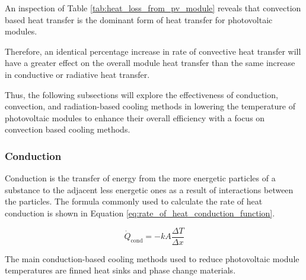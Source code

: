 An inspection of Table \ref{tab:heat_loss_from_pv_module} reveals that convection based heat transfer is the dominant form of heat transfer for photovoltaic modules.\par
Therefore, an identical percentage increase in rate of convective heat transfer will have a greater effect on the overall module heat transfer than the same increase in conductive or radiative heat transfer.\par
Thus, the following subsections will explore the effectiveness of conduction, convection, and radiation-based cooling methods in lowering the temperature of photovoltaic modules to enhance their overall efficiency with a focus on convection based cooling methods.\vspace{0.5em}


\subsubsection{Conduction}
Conduction is the transfer of energy from the more energetic particles of a substance to the adjacent less energetic ones as a result of interactions between the particles. The formula commonly used to calculate the rate of heat conduction is shown in Equation \ref{eq:rate_of_heat_conduction_function}. \cite{Cengel2014IntroductionConcepts}

\begin{equation}
    \dot{Q}_\text{cond} = -kA\frac{\Delta T}{\Delta x}
    \label{eq:rate_of_heat_conduction_function}
\end{equation}

The main conduction-based cooling methods used to reduce photovoltaic module temperatures are finned heat sinks and phase change materials.\vspace{0.5em}

